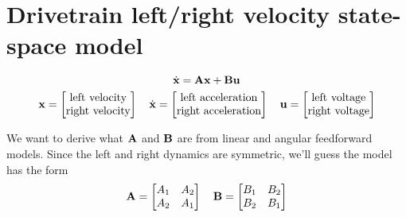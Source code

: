 \section{Drivetrain left/right velocity state-space model}
\begin{equation*}
  \dot{\mathbf{x}} = \mathbf{A}\mathbf{x} + \mathbf{B}\mathbf{u}
\end{equation*}
\begin{equation*}
  \mathbf{x} = \begin{bmatrix}
    \text{left velocity} \\
    \text{right velocity}
  \end{bmatrix}
  \quad
  \dot{\mathbf{x}} = \begin{bmatrix}
    \text{left acceleration} \\
    \text{right acceleration}
  \end{bmatrix}
  \quad
  \mathbf{u} = \begin{bmatrix}
    \text{left voltage} \\
    \text{right voltage}
  \end{bmatrix}
\end{equation*}

We want to derive what $\mathbf{A}$ and $\mathbf{B}$ are from linear and angular
feedforward models. Since the left and right dynamics are symmetric, we'll guess
the model has the form
\begin{equation*}
  \mathbf{A} = \begin{bmatrix}
    A_1 & A_2 \\
    A_2 & A_1
  \end{bmatrix}
  \quad
  \mathbf{B} = \begin{bmatrix}
    B_1 & B_2 \\
    B_2 & B_1
  \end{bmatrix}
\end{equation*}

